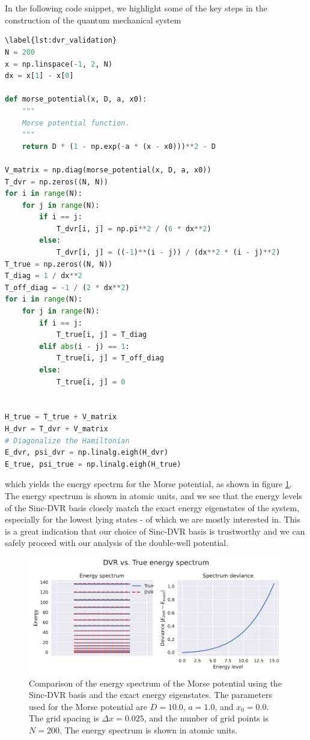\documentclass{subfiles}
\begin{document}
\\ \\ In the following code snippet, we highlight some of the key steps in the construction of the quantum mechanical system
\begin{lstlisting}[language=Python]\label{lst:dvr_validation}
N = 200
x = np.linspace(-1, 2, N)
dx = x[1] - x[0]

def morse_potential(x, D, a, x0):
    """
    Morse potential function.
    """
    return D * (1 - np.exp(-a * (x - x0)))**2 - D

V_matrix = np.diag(morse_potential(x, D, a, x0))
T_dvr = np.zeros((N, N))
for i in range(N):
    for j in range(N):
        if i == j:
            T_dvr[i, j] = np.pi**2 / (6 * dx**2)
        else:
            T_dvr[i, j] = ((-1)**(i - j)) / (dx**2 * (i - j)**2)
T_true = np.zeros((N, N))
T_diag = 1 / dx**2 
T_off_diag = -1 / (2 * dx**2)
for i in range(N):
    for j in range(N):
        if i == j:
            T_true[i, j] = T_diag
        elif abs(i - j) == 1:
            T_true[i, j] = T_off_diag
        else:
            T_true[i, j] = 0


H_true = T_true + V_matrix
H_dvr = T_dvr + V_matrix
# Diagonalize the Hamiltonian
E_dvr, psi_dvr = np.linalg.eigh(H_dvr)
E_true, psi_true = np.linalg.eigh(H_true)
\end{lstlisting}
which yields the energy spectrm for the Morse potential, as shown in figure \ref{fig:dvr_validation}. The energy spectrum is shown in atomic units, and we see that the energy levels of the Sinc-DVR basis closely match the exact energy eigenstates of the system, especially for the lowest lying states - of which we are mostly interested in. This is a great indication that our choice of Sinc-DVR basis is trustworthy and we can safely proceed with our analysis of the double-well potential. 
\begin{figure}[h!]
    \centering
    \includegraphics[width=\textwidth]{figs/dvr_validation.pdf}
    \caption{Comparison of the energy spectrum of the Morse potential using the Sinc-DVR basis and the exact energy eigenstates. The parameters used for the Morse potential are $D = 10.0$, $a = 1.0$, and $x_0 = 0.0$. The grid spacing is $\Delta x = 0.025$, and the number of grid points is $N = 200$. The energy spectrum is shown in atomic units.}
    \label{fig:dvr_validation}
\end{figure}
\end{document}
